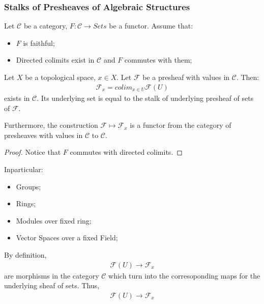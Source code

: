 \documentclass[Total.tex]{subfiles}
\begin{document}
				\subsubsection{Stalks of Presheaves of Algebraic Structures}
				\begin{lemma}
					Let $\mathcal{C}$ be a category, $F:\mathcal{C}\rightarrow Sets$ be a functor. Assume that:
					\begin{itemize}
						\item $F$ is faithful;
						\item Directed colimits exist in $\mathcal{C}$ and $F$ commutes with them;
					\end{itemize}
					Let $X$ be a topological space, $x\in X$. Let $\mathcal{F}$ be a presheaf with values in $\mathcal{C}$. Then:
					\begin{gather*}
						\mathcal{F}_x=colim_{x\in U} \mathcal{F}(U)
					\end{gather*}
					exists in $\mathcal{C}$. Its underlying set is equal to the stalk of underlying presheaf of sets of $\mathcal{F}$.
					
					Furthermore, the construction $\mathcal{F}\mapsto \mathcal{F}_x$ is a functor from the category of presheaves with values in $\mathcal{C}$ to $\mathcal{C}$.
				\end{lemma}
				\begin{proof}
					Notice that $F$ commutes with directed colimits.
				\end{proof}
				Inparticular:
				\begin{itemize}
					\item Groups;
					\item Rings;
					\item Modules over fixed ring;
					\item Vector Spaces over a fixed Field;
				\end{itemize}
				By definition,
				\begin{gather*}
					\mathcal{F}(U)\rightarrow \mathcal{F}_x
				\end{gather*}
				are morphisms in the category $\mathcal{C}$ which turn into the corresoponding maps for the underlying sheaf of sets. Thus,
				\begin{gather*}
					\mathcal{F}(U)\rightarrow \mathcal{F}_x
				\end{gather*}
\end{document}
